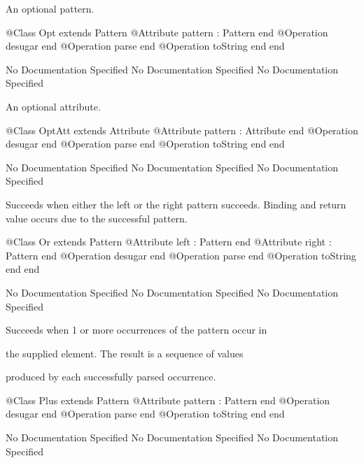       An optional pattern.
\begin{Interface}
@Class Opt extends Pattern
  @Attribute pattern : Pattern end
  @Operation desugar end
  @Operation parse end
  @Operation toString end
end
\end{Interface}
No Documentation Specified
No Documentation Specified
No Documentation Specified

      An optional attribute.
\begin{Interface}
@Class OptAtt extends Attribute
  @Attribute pattern : Attribute end
  @Operation desugar end
  @Operation parse end
  @Operation toString end
end
\end{Interface}
No Documentation Specified
No Documentation Specified
No Documentation Specified

      Succeeds when either the left or the right pattern succeeds.
      Binding and return value occurs due to the successful pattern.
\begin{Interface}
@Class Or extends Pattern
  @Attribute left : Pattern end
  @Attribute right : Pattern end
  @Operation desugar end
  @Operation parse end
  @Operation toString end
end
\end{Interface}
No Documentation Specified
No Documentation Specified
No Documentation Specified

      Succeeds when 1 or more occurrences of the pattern occur in

      the supplied element. The result is a sequence of values

      produced by each successfully parsed occurrence.
\begin{Interface}
@Class Plus extends Pattern
  @Attribute pattern : Pattern end
  @Operation desugar end
  @Operation parse end
  @Operation toString end
end
\end{Interface}
No Documentation Specified
No Documentation Specified
No Documentation Specified

